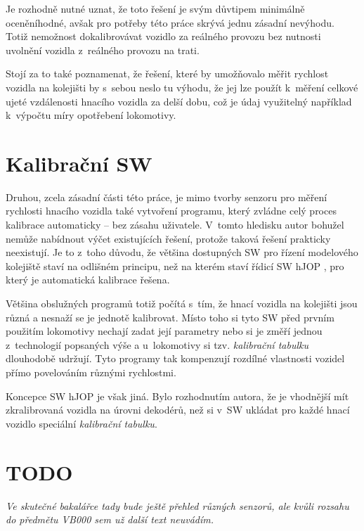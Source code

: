 Je rozhodně nutné uznat, že toto řešení je svým důvtipem minimálně oceněníhodné,
avšak pro potřeby této práce skrývá jednu zásadní nevýhodu. Totiž nemožnost
dokalibrovávat vozidlo za reálného provozu bez nutnosti uvolnění vozidla
z~reálného provozu na trati.

Stojí za to také poznamenat, že řešení, které by umožňovalo měřit rychlost
vozidla na kolejišti by s~sebou neslo tu výhodu, že jej lze použít k~měření
celkové ujeté vzdálenosti hnacího vozidla za delší dobu, což je údaj využitelný
například k~výpočtu míry opotřebení lokomotivy.

\section{Kalibrační SW}

Druhou, zcela zásadní části této práce, je mimo tvorby senzoru pro měření
rychlosti hnacího vozidla také vytvoření programu, který zvládne celý proces
kalibrace automaticky -- bez zásahu uživatele. V~tomto hledisku autor bohužel
nemůže nabídnout výčet existujících řešení, protože taková řešení
prakticky neexistují. Je to z~toho důvodu, že většina dostupných SW pro řízení
modelového kolejiště staví na odlišném principu, než na kterém staví řídicí SW
hJOP \cite{hjop:web}, pro který je automatická kalibrace řešena.

Většina obslužných programů totiž počítá s~tím, že hnací vozidla na kolejišti
jsou různá a nesnaží se je jednotě kalibrovat. Místo toho si tyto SW před
prvním použitím lokomotivy nechají zadat její parametry nebo si je změří jednou
z~technologií popsaných výše a u~lokomotivy si tzv. \textit{kalibrační tabulku}
dlouhodobě udržují. Tyto programy tak kompenzují rozdílné vlastnosti vozidel přímo
povelováním různými rychlostmi.

Koncepce SW hJOP je však jiná. Bylo rozhodnutím autora, že je vhodnější mít
zkralibrovaná vozidla na úrovni dekodérů, než si v~SW ukládat pro každé hnací
vozidlo speciální \textit{kalibrační tabulku}.

\section{TODO}

\textit{Ve skutečné bakalářce tady bude ještě přehled různých senzorů, ale
kvůli rozsahu do předmětu VB000 sem už další text neuvádím.}
